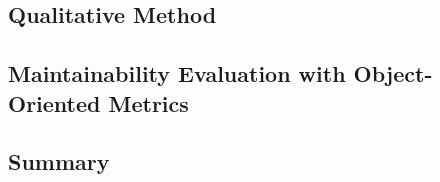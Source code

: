 \subsection{Qualitative Method}


\subsection{Maintainability Evaluation with Object-Oriented Metrics}
\label{section:3.2}


\subsection{Summary}

